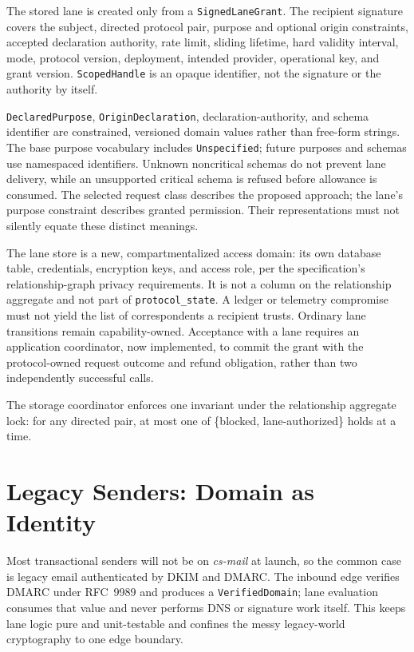 \documentclass[11pt]{article}
\begin{document}
The stored lane is created only from a \texttt{SignedLaneGrant}. The recipient
signature covers the subject, directed protocol pair, purpose and optional origin
constraints, accepted declaration authority, rate limit, sliding lifetime, hard
validity interval, mode, protocol version, deployment, intended provider,
operational key, and grant version. \texttt{ScopedHandle} is an opaque identifier,
not the signature or the authority by itself.

\texttt{DeclaredPurpose}, \texttt{OriginDeclaration}, declaration-authority, and
schema identifier are constrained, versioned domain values rather than free-form
strings. The base purpose vocabulary includes \texttt{Unspecified}; future
purposes and schemas use namespaced identifiers. Unknown noncritical schemas do
not prevent lane delivery, while an unsupported critical schema is refused before
allowance is consumed.
The selected request class describes the proposed approach; the lane's purpose
constraint describes granted permission. Their representations must not silently
equate these distinct meanings.

The lane store is a new, compartmentalized access domain: its own database table,
credentials, encryption keys, and access role, per the specification's
relationship-graph privacy requirements. It is not a column on the relationship
aggregate and not part of \texttt{protocol\_state}. A ledger or telemetry
compromise must not yield the list of correspondents a recipient trusts. Ordinary
lane transitions remain capability-owned. Acceptance with a lane requires an
application coordinator, now implemented, to commit the grant with the protocol-owned request
outcome and refund obligation, rather than two independently successful calls.

The storage coordinator enforces one invariant under the relationship aggregate
lock: for any directed pair, at most one of \{blocked, lane-authorized\} holds at
a time.

\section{Legacy Senders: Domain as Identity}

Most transactional senders will not be on \textit{cs-mail} at launch, so the
common case is legacy email authenticated by DKIM and DMARC. The inbound edge
verifies DMARC under RFC~9989 and produces a \texttt{VerifiedDomain}; lane evaluation
consumes that value and never performs DNS or signature work itself. This keeps
lane logic pure and unit-testable and confines the messy legacy-world
cryptography to one edge boundary.
\end{document}
